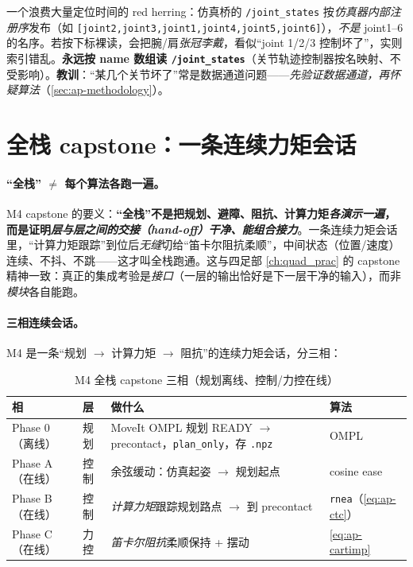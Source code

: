 \begin{pitfall}\label{pit:ap-jointorder}
一个浪费大量定位时间的 red herring：仿真桥的 \texttt{/\allowbreak joint\_states} 按\emph{仿真器内部注册序}发布（如 \texttt{[joint2,joint3,joint1,joint4,joint5,joint6]}），\emph{不是} joint1--6 的名序。若按下标裸读，会把腕/肩\emph{张冠李戴}，看似“joint 1/2/3 控制坏了”，实则索引错乱。\textbf{永远按 name 数组读 \texttt{/\allowbreak joint\_states}}（关节轨迹控制器按名映射、不受影响）。\textbf{教训}：“某几个关节坏了”常是数据通道问题——\emph{先验证数据通道，再怀疑算法}（\cref{sec:ap-methodology}）。
\end{pitfall}

\section{全栈 capstone：一条连续力矩会话}
\label{sec:ap-capstone}

\paragraph{“全栈” $\ne$ 每个算法各跑一遍。}
\begin{insight}\label{ins:ap-fullstack}
M4 capstone 的要义：\textbf{“全栈”不是把规划、避障、阻抗、计算力矩\emph{各演示一遍}，而是证明\emph{层与层之间的交接（hand-off）干净、能组合接力}}。一条连续力矩会话里，“计算力矩跟踪”到位后\emph{无缝}切给“笛卡尔阻抗柔顺”，中间状态（位置/速度）连续、不抖、不跳——这才叫全栈跑通。这与四足部 \cref{ch:quad_prac} 的 capstone 精神一致：真正的集成考验是\emph{接口}（一层的输出恰好是下一层干净的输入），而非\emph{模块}各自能跑。
\end{insight}

\paragraph{三相连续会话。}
M4 是一条“规划 $\to$ 计算力矩 $\to$ 阻抗”的连续力矩会话，分三相：

\begin{table}[H]\centering\small
\caption{M4 全栈 capstone 三相（规划离线、控制/力控在线）}
\begin{tabular}{p{} p{} p{} p{}}
\toprule
相 & 层 & 做什么 & 算法 \\
\midrule
Phase 0（离线）& 规划 & MoveIt OMPL 规划 READY $\to$ precontact，\texttt{plan\_only}，存 \texttt{.npz} & OMPL \\
Phase A（在线）& 控制 & 余弦缓动：仿真起姿 $\to$ 规划起点 & cosine ease \\
Phase B（在线）& 控制 & \emph{计算力矩}跟踪规划路点 $\to$ 到 precontact & \texttt{rnea}（\cref{eq:ap-ctc}）\\
Phase C（在线）& 力控 & \emph{笛卡尔阻抗}柔顺保持 + 摆动 & \cref{eq:ap-cartimp} \\
\bottomrule
\end{tabular}
\label{tab:ap-capstone}
\end{table}

